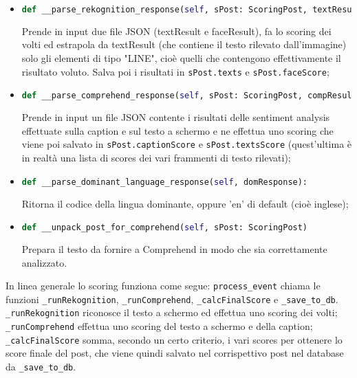 \begin{itemize}
\item 
\begin{lstlisting}[language=Python, numbers=none]
def __parse_rekognition_response(self, sPost: ScoringPost, textResult, faceResult):
\end{lstlisting}
Prende in input due file JSON (textResult e faceResult), fa lo scoring dei volti ed estrapola 
da textResult (che contiene il testo rilevato dall'immagine) solo gli elementi di tipo "LINE", 
cioè quelli che contengono effettivamente il risultato voluto.
Salva poi i risultati in \verb+sPost.texts+ e \verb+sPost.faceScore+;

\item 
\begin{lstlisting}[language=Python, numbers=none]
def __parse_comprehend_response(self, sPost: ScoringPost, compResult):
\end{lstlisting}
Prende in input un file JSON contente i risultati delle sentiment analysis effettuate 
sulla caption e sul testo a schermo e ne effettua uno scoring che viene poi salvato 
in \verb+sPost.captionScore+ e \verb+sPost.textsScore+ (quest'ultima è in realtà una lista 
di scores dei vari frammenti di testo rilevati);

\item 
\begin{lstlisting}[language=Python, numbers=none]
def __parse_dominant_language_response(self, domResponse):
\end{lstlisting}
Ritorna il codice della lingua dominante, oppure 'en' di default (cioè inglese);

\item 
\begin{lstlisting}[language=Python, numbers=none]
def __unpack_post_for_comprehend(self, sPost: ScoringPost)
\end{lstlisting}
Prepara il testo da fornire a Comprehend in modo che sia correttamente analizzato.
\end{itemize}
In linea generale lo scoring funziona come segue:
\verb+process_event+ chiama le funzioni \verb+_runRekognition+, \verb+_runComprehend+,
\verb+_calcFinalScore+ e \verb+_save_to_db+.\\
\verb+_runRekognition+ riconosce il testo a schermo ed effettua uno scoring dei volti;\\
\verb+_runComprehend+ effettua uno scoring del testo a schermo e della caption;\\
\verb+_calcFinalScore+ somma, secondo un certo criterio, i vari scores per ottenere lo score
finale del post, che viene quindi salvato nel corrispettivo post nel database da \verb+_save_to_db+.
